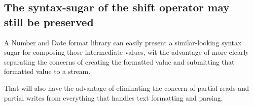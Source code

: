 \subsection*{The syntax-\/sugar of the shift operator may still be preserved}

A Number and Date format library can easily present a similar-\/looking syntax sugar for composing those intermediate values, wit the advantage of more clearly separating the concerns of creating the formatted value and submitting that formatted value to a stream.

That will also have the advantage of eliminating the concern of partial reads and partial writes from everything that handles text formatting and parsing. 